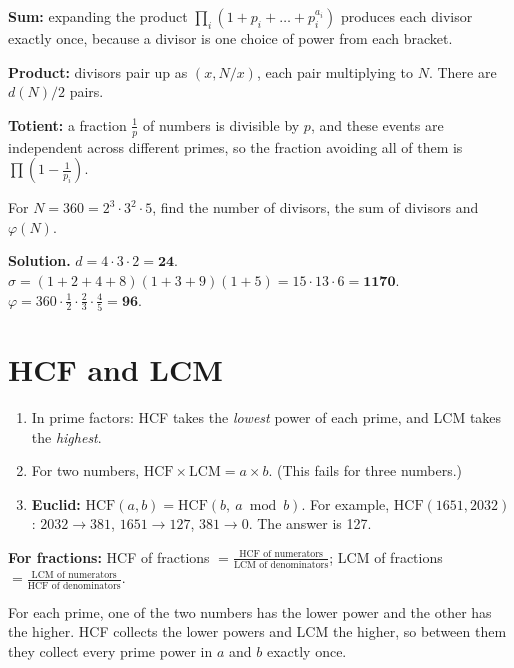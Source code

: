 \documentclass[11pt,a4paper,openany]{report}
\begin{document}
\begin{why}
\textbf{Sum:} expanding the product $\prod_i(1+p_i+\dots+p_i^{a_i})$ produces each divisor exactly once, because a divisor is one choice of power from each bracket.

\textbf{Product:} divisors pair up as $(x, N/x)$, each pair multiplying to $N$. There are $d(N)/2$ pairs.

\textbf{Totient:} a fraction $\frac1{p}$ of numbers is divisible by $p$, and these events are independent across different primes, so the fraction avoiding all of them is $\prod(1-\frac1{p_i})$.
\end{why}

\begin{example}
For $N=360=2^3\cdot3^2\cdot5$, find the number of divisors, the sum of divisors and $\varphi(N)$.

\textbf{Solution.} $d=4\cdot3\cdot2=\mathbf{24}$. $\sigma=(1+2+4+8)(1+3+9)(1+5)=15\cdot13\cdot6=\mathbf{1170}$.
$\varphi=360\cdot\frac12\cdot\frac23\cdot\frac45=\mathbf{96}$.
\end{example}

\section{HCF and LCM}
\begin{idea}
\begin{enumerate}[nosep]
\item In prime factors: HCF takes the \emph{lowest} power of each prime, and LCM takes the \emph{highest}.
\item For two numbers, $\text{HCF}\times\text{LCM}=a\times b$. (This fails for three numbers.)
\item \textbf{Euclid:} $\text{HCF}(a,b)=\text{HCF}(b,\ a\bmod b)$. For example, $\text{HCF}(1651,2032)$: $2032\to381$, $1651\to127$, $381\to0$. The answer is 127.
\end{enumerate}
\textbf{For fractions:} HCF of fractions $=\frac{\text{HCF of numerators}}{\text{LCM of denominators}}$; LCM of fractions $=\frac{\text{LCM of numerators}}{\text{HCF of denominators}}$.
\end{idea}

\begin{why}[Why $\text{HCF}\times\text{LCM}=ab$]
For each prime, one of the two numbers has the lower power and the other has the higher. HCF collects the lower powers and LCM the higher, so between them they collect every prime power in $a$ and $b$ exactly once.
\end{why}
\end{document}
